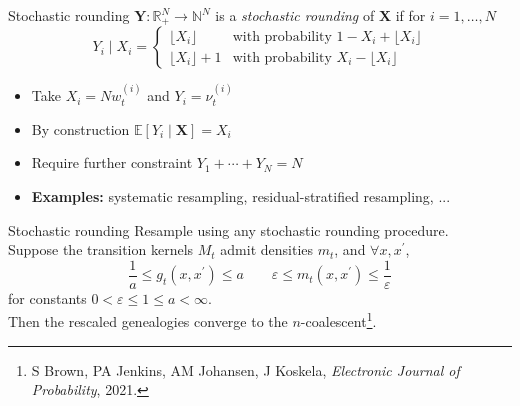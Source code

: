 \documentclass[aspectratio=169]{beamer}
\theoremstyle{definition}
\newcommand{\E}{\mathbb{E}}
\newcommand{\vt}[2][t]{\nu_{#1}^{(#2)}}
\newcommand{\wt}[2][t]{w_{#1}^{(#2)}}
\begin{document}
\begin{frame}{Stochastic rounding}
$\mathbf{Y}: \mathbb{R}_+^N \to \mathbb{N}^N$ is a \emph{stochastic rounding} of $\mathbf{X}$ if for $i=1,\dots,N$
\begin{equation*}
Y_i \mid X_i =
\begin{cases}
 \lfloor X_i \rfloor & \text{with probability } 1- X_i + \lfloor X_i \rfloor \\
  \lfloor X_i \rfloor +1 & \text{with probability } X_i - \lfloor X_i \rfloor 
\end{cases}
\end{equation*}
\pause
\begin{itemize}
\item Take $X_i = N\wt{i}$ and $Y_i = \vt{i}$
\item By construction $\E[Y_i \mid \mathbf{X}] = X_i$
\item Require further constraint $Y_1 + \cdots + Y_N = N$
\pause
\item \textbf{Examples:} systematic resampling, residual-stratified resampling, ...
\end{itemize}
\end{frame}


\begin{frame}{Stochastic rounding}
Resample using any stochastic rounding procedure.\\[10pt]
\pause
Suppose the transition kernels $M_t$ admit densities $m_t$, and $\forall x, x^\prime$,
\begin{equation*}
\frac{1}{a} \leq g_t(x, x^\prime) \leq a \qquad
\varepsilon \leq m_t(x, x^\prime) \leq \frac{1}{\varepsilon} 
\end{equation*}
for constants $0<\varepsilon\leq 1\leq a<\infty$.\\[10pt]
\pause
Then the rescaled genealogies converge to the $n$-coalescent\footnote{S Brown, PA Jenkins, AM Johansen, J Koskela,  \textit{Electronic Journal of Probability}, 2021.}.
\end{frame}
\end{document}
